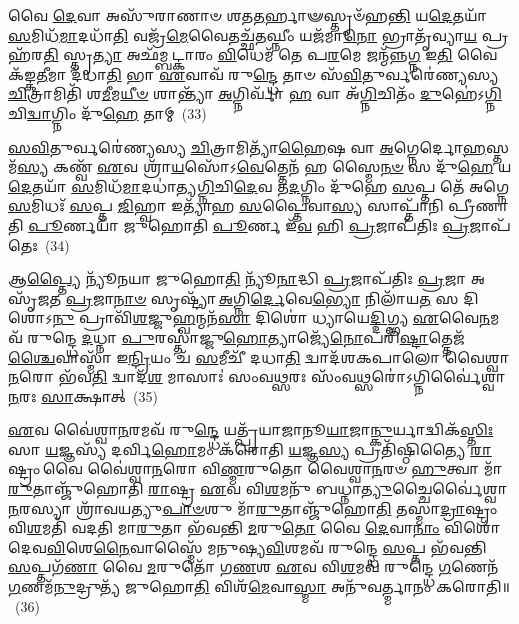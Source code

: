 𑌵𑍈 \ul{𑌦𑍇}\-𑌵𑌾 𑌅𑌸𑍁᳴𑌰𑌾𑌣𑌾𑍞 𑌶𑌤\-\ul{𑌤}\-𑌰𑍍\mbox{}𑌹𑌾𑍟𑌸𑍍𑌤𑍃𑍞᳴𑌹\-\ul{𑌨𑍍𑌤𑌿} 𑌯\-\ul{𑌦𑍇}\-𑌤𑌯𑌾᳴ \ul{𑌸}\-𑌮𑌿𑌧᳴\-\ul{𑌮𑌾}\-𑌦𑌧𑌾᳴\-\ul{𑌤𑌿} 𑌵𑌜𑍍𑌰᳴\-\ul{𑌮𑍇}\-𑌵𑍈𑌤𑌚𑍍𑌛᳴\-\ul{𑌤}\-𑌘𑍍𑌨𑍀𑌂 𑌯𑌜᳴𑌮𑌾\-\ul{𑌨𑍋} 𑌭𑍍𑌰𑌾𑌤𑍃᳴𑌵𑍍𑌯𑌾\-\ul{𑌯} 𑌪𑍍𑌰 𑌹᳴𑌰\-\ul{𑌤𑌿} 𑌸𑍍𑌤𑍃\-\ul{𑌤𑍍𑌯𑌾} 𑌅𑌛᳴𑌮𑍍𑌬𑌟𑍍𑌕𑌾𑌰𑌂 \ul{𑌵𑌿}\-𑌧𑍇𑌮᳴ 𑌤𑍇 𑌪\-\ul{𑌰}\-𑌮𑍇 𑌜𑌨𑍍𑌮᳴𑌨𑍍𑌨\-\ul{𑌗𑍍𑌨} 𑌇\-\ul{𑌤𑌿} 𑌵𑍈𑌕᳴𑌙𑍍𑌕\-\ul{𑌤𑍀}\-𑌮𑌾 𑌦᳴𑌧𑌾\-\ul{𑌤𑌿} 𑌭𑌾 \ul{𑌏}\-𑌵𑌾𑌵᳴ 𑌰𑍁\-\ul{𑌨𑍍𑌦𑍍𑌧𑍇} 𑌤𑌾𑍞 𑌸᳴\-\ul{𑌵𑌿}\-𑌤𑍁𑌰𑍍𑌵𑌰𑍇॑𑌣𑍍𑌯𑌸𑍍𑌯 \ul{𑌚𑌿}\-𑌤𑍍𑌰𑌾𑌮𑌿𑌤𑌿᳴ 𑌶\-\ul{𑌮𑍀}\-𑌮\-\ul{𑌯𑍀}\-\-\ul{𑍞} 𑌶𑌾𑌨𑍍𑌤𑍍𑌯𑌾᳴ \ul{𑌅}\-𑌗𑍍𑌨𑌿𑌰𑍍𑌵𑌾᳴ \ul{𑌹} 𑌵𑌾 𑌅᳴\-\ul{𑌗𑍍𑌨𑌿}\-𑌚𑌿𑌤𑌂᳴ \ul{𑌦𑍁}\-𑌹𑍇॑\-𑌽\-\ul{𑌗𑍍𑌨𑌿}\-𑌚𑌿\-\ul{𑌦𑍍𑌵𑌾}\-𑌗𑍍𑌨𑌿𑌂 𑌦𑍁᳴\-\ul{𑌹𑍇} 𑌤𑌾𑌮𑍍~(33)

\-\ul{𑌸}\-\-\ul{𑌵𑌿}\-𑌤𑍁𑌰𑍍𑌵𑌰𑍇॑𑌣𑍍𑌯𑌸𑍍𑌯 \ul{𑌚𑌿}\-𑌤𑍍𑌰𑌾𑌮𑌿𑌤𑍍𑌯𑌾᳴\-\ul{𑌹𑍈}\-𑌷 𑌵𑌾 \ul{𑌅}\-𑌗𑍍𑌨𑍇𑌰𑍍𑌦𑍋\-\ul{𑌹}\-𑌸𑍍𑌤𑌮᳴\-\ul{𑌸𑍍𑌯} 𑌕𑌣𑍍𑌵᳴ \ul{𑌏}\-𑌵 𑌶𑍍𑌰𑌾᳴\-\ul{𑌯}\-𑌸𑍋᳴\-𑌽\-\ul{𑌵𑍇}\-𑌤𑍍𑌤𑍇𑌨᳴ 𑌹 𑌸𑍍𑌮𑍈\-\ul{𑌨}\-\-\ul{𑍞} 𑌸 𑌦𑍁᳴\-\ul{𑌹𑍇} 𑌯\-\ul{𑌦𑍇}\-𑌤𑌯𑌾᳴ \ul{𑌸}\-𑌮𑌿𑌧᳴\-\ul{𑌮𑌾}\-𑌦𑌧𑌾॑𑌤𑍍𑌯\-\ul{𑌗𑍍𑌨𑌿}\-𑌚𑌿\-\ul{𑌦𑍇}\-𑌵 𑌤\-\ul{𑌦}\-𑌗𑍍𑌨𑌿𑌂 𑌦𑍁᳴𑌹𑍇 \ul{𑌸}\-𑌪𑍍𑌤 𑌤𑍇᳴ 𑌅𑌗𑍍𑌨𑍇 \ul{𑌸}\-𑌮𑌿𑌧𑌃᳴ \ul{𑌸}\-𑌪𑍍𑌤 \ul{𑌜𑌿}\-𑌹𑍍𑌵𑌾 𑌇𑌤𑍍𑌯𑌾᳴𑌹 \ul{𑌸}\-𑌪𑍍𑌤𑍈𑌵𑌾\-\ul{𑌸𑍍𑌯} 𑌸𑌾𑌪𑍍𑌤𑌾᳴𑌨𑌿 𑌪𑍍𑌰𑍀𑌣𑌾𑌤𑌿 \ul{𑌪𑍂}\-𑌰𑍍𑌣𑌯𑌾᳴ 𑌜𑍁𑌹𑍋𑌤𑌿 \ul{𑌪𑍂}\-𑌰𑍍𑌣 𑌇᳴\-\ul{𑌵} 𑌹𑌿 \ul{𑌪𑍍𑌰}\-𑌜𑌾𑌪᳴𑌤𑌿𑌃 \ul{𑌪𑍍𑌰}\-𑌜𑌾𑌪᳴𑌤𑍇𑌃~(34)

𑌆\-\ul{𑌪𑍍𑌤𑍍𑌯𑍈} 𑌨𑍍𑌯𑍂᳴𑌨𑌯𑌾 𑌜𑍁𑌹𑍋\-\ul{𑌤𑌿} 𑌨𑍍𑌯𑍂᳴\-\ul{𑌨𑌾}\-𑌦𑍍𑌧𑌿 \ul{𑌪𑍍𑌰}\-𑌜𑌾𑌪᳴𑌤𑌿𑌃 \ul{𑌪𑍍𑌰}\-𑌜𑌾 𑌅𑌸𑍃᳴𑌜𑌤 \ul{𑌪𑍍𑌰}\-𑌜𑌾\-\ul{𑌨𑌾}\-\-\ul{𑍞} 𑌸𑍃𑌷𑍍𑌟𑍍𑌯𑌾᳴ \ul{𑌅}\-𑌗𑍍𑌨𑌿\-\ul{𑌰𑍍𑌦𑍇}\-𑌵𑍇\-\ul{𑌭𑍍𑌯𑍋} 𑌨𑌿𑌲𑌾᳴𑌯\-\ul{𑌤} 𑌸 𑌦𑌿𑌶𑍋\-𑌽\-\ul{𑌨𑍁} 𑌪𑍍𑌰𑌾𑌵𑌿᳴\-\ul{𑌶}\-𑌜𑍍𑌜𑍁\-\ul{𑌹𑍍𑌵}\-𑌨𑍍𑌮𑌨᳴\-\ul{𑌸𑌾} 𑌦𑌿𑌶𑍋॑ 𑌧𑍍𑌯𑌾𑌯𑍇\-\ul{𑌦𑍍𑌦𑌿}\-𑌗𑍍𑌭𑍍𑌯 \ul{𑌏}\-𑌵𑍈\-\ul{𑌨}\-𑌮𑌵᳴ 𑌰𑍁𑌨𑍍𑌦𑍍𑌧𑍇 \ul{𑌦}\-𑌧𑍍𑌨𑌾 \ul{𑌪𑍁}\-𑌰𑌸𑍍𑌤𑌾॑𑌜𑍍𑌜𑍁\-\ul{𑌹𑍋}\-𑌤𑍍𑌯𑌾𑌜𑍍𑌯𑍇᳴\-\ul{𑌨𑍋}\-𑌪𑌰𑌿᳴\-\ul{𑌷𑍍𑌟𑌾}\-𑌤𑍍𑌤𑍇𑌜᳴\-\ul{𑌶𑍍𑌚𑍈}\-𑌵𑌾𑌸𑍍𑌮𑌾᳴ 𑌇\-\ul{𑌨𑍍𑌦𑍍𑌰𑌿}\-𑌯𑌂 𑌚᳴ \ul{𑌸}\-𑌮𑍀𑌚𑍀᳴ 𑌦𑌧𑌾\-\ul{𑌤𑌿} 𑌦𑍍𑌵𑌾𑌦᳴𑌶\-𑌕𑌪𑌾𑌲𑍋 𑌵𑍈𑌶𑍍𑌵𑌾\-\ul{𑌨}\-𑌰𑍋 𑌭᳴𑌵\-\ul{𑌤𑌿} 𑌦𑍍𑌵𑌾𑌦᳴\-\ul{𑌶} 𑌮𑌾𑌸𑌾𑌃॑ 𑌸𑌂𑌵\-\ul{𑌥𑍍𑌸}\-𑌰𑌃 𑌸𑌂᳴𑌵\-\ul{𑌥𑍍𑌸}\-𑌰𑍋॑\-𑌽𑌗𑍍𑌨𑌿𑌰𑍍𑌵𑍈॑𑌶𑍍𑌵𑌾\-\ul{𑌨}\-𑌰𑌃 \ul{𑌸𑌾}\-𑌕𑍍𑌷𑌾𑌤𑍍~(35)

\-\ul{𑌏}\-𑌵 𑌵𑍈॑𑌶𑍍𑌵𑌾\-\ul{𑌨}\-𑌰𑌮𑌵᳴ 𑌰𑍁\-\ul{𑌨𑍍𑌦𑍍𑌧𑍇} 𑌯𑌤𑍍𑌪𑍍𑌰᳴𑌯𑌾𑌜𑌾𑌨𑍂\-\ul{𑌯𑌾}\-𑌜𑌾\-\ul{𑌨𑍍𑌕𑍁}\-𑌰𑍍𑌯𑌾𑌦𑍍𑌵𑌿𑌕᳴\-\ul{𑌸𑍍𑌤𑌿𑌃} 𑌸𑌾 \ul{𑌯}\-𑌜𑍍𑌞𑌸𑍍𑌯᳴ 𑌦𑌰𑍍𑌵𑌿\-\ul{𑌹𑍋}\-𑌮𑌂 𑌕᳴𑌰𑍋𑌤𑌿 \ul{𑌯}\-𑌜𑍍𑌞\-\ul{𑌸𑍍𑌯} 𑌪𑍍𑌰𑌤𑌿᳴𑌷𑍍𑌠𑌿𑌤𑍍𑌯𑍈 \ul{𑌰𑌾}\-𑌷𑍍𑌟𑍍𑌰𑌂 𑌵𑍈 𑌵𑍈॑𑌶𑍍𑌵𑌾\-\ul{𑌨}\-𑌰𑍋 𑌵𑌿\-\ul{𑌣𑍍𑌮}\-𑌰𑍁𑌤𑍋 𑌵𑍈𑌶𑍍𑌵𑌾\-\ul{𑌨}\-𑌰𑍞 \ul{𑌹𑍁}\-𑌤𑍍𑌵𑌾 𑌮𑌾᳴\-\ul{𑌰𑍁}\-𑌤𑌾𑌞𑍍𑌜𑍁᳴𑌹𑍋𑌤𑌿 \ul{𑌰𑌾}\-𑌷𑍍𑌟𑍍𑌰 \ul{𑌏}\-𑌵 𑌵𑌿\-\ul{𑌶}\-𑌮𑌨𑍁᳴ 𑌬𑌧𑍍𑌨𑌾\-\ul{𑌤𑍍𑌯𑍁}\-𑌚𑍍𑌚𑍈𑌰𑍍𑌵𑍈॑𑌶𑍍𑌵𑌾\-\ul{𑌨}\-𑌰𑌸𑍍𑌯𑌾 𑌶𑍍𑌰𑌾᳴𑌵𑌯𑌤𑍍𑌯𑍁\-\ul{𑌪𑌾}\-\-\ul{𑍞}\-𑌶𑍁 𑌮𑌾᳴\-\ul{𑌰𑍁}\-𑌤𑌾𑌞𑍍𑌜𑍁᳴𑌹𑍋\-\ul{𑌤𑌿} 𑌤𑌸𑍍𑌮𑌾॑\-\ul{𑌦𑍍𑌰𑌾}\-𑌷𑍍𑌟𑍍𑌰𑌂 𑌵𑌿\-\ul{𑌶}\-𑌮𑌤𑌿᳴ 𑌵𑌦𑌤𑌿 𑌮𑌾\-\ul{𑌰𑍁}\-𑌤𑌾 𑌭᳴𑌵𑌨𑍍𑌤𑌿 \ul{𑌮}\-𑌰𑍁\-\ul{𑌤𑍋} 𑌵𑍈 \ul{𑌦𑍇}\-𑌵𑌾\-\ul{𑌨𑌾𑌂} 𑌵𑌿𑌶𑍋᳴ 𑌦𑍇𑌵\-\ul{𑌵𑌿}\-𑌶𑍇\-\ul{𑌨𑍈}\-𑌵𑌾𑌸𑍍𑌮𑍈᳴ 𑌮𑌨𑍁𑌷𑍍𑌯\-\ul{𑌵𑌿}\-𑌶𑌮𑌵᳴ 𑌰𑍁𑌨𑍍𑌦𑍍𑌧𑍇 \ul{𑌸}\-𑌪𑍍𑌤 𑌭᳴𑌵𑌨𑍍𑌤𑌿 \ul{𑌸}\-𑌪𑍍𑌤𑌗᳴\-\ul{𑌣𑌾} 𑌵𑍈 \ul{𑌮}\-𑌰𑍁𑌤𑍋᳴ 𑌗\-\ul{𑌣}\-𑌶 \ul{𑌏}\-𑌵 𑌵𑌿\-\ul{𑌶}\-𑌮𑌵᳴ 𑌰𑍁𑌨𑍍𑌦𑍍𑌧𑍇 \ul{𑌗}\-𑌣𑍇𑌨᳴ \ul{𑌗}\-𑌣𑌮᳴\-\ul{𑌨𑍁}\-𑌦𑍍𑌰𑍁𑌤𑍍𑌯᳴ 𑌜𑍁𑌹𑍋\-\ul{𑌤𑌿} 𑌵𑌿𑌶᳴\-\ul{𑌮𑍇}\-𑌵𑌾\-\ul{𑌸𑍍𑌮𑌾} 𑌅𑌨𑍁᳴𑌵𑌰𑍍𑌤𑍍𑌮𑌾𑌨𑌂 𑌕𑌰𑍋𑌤𑌿॥~(36)

